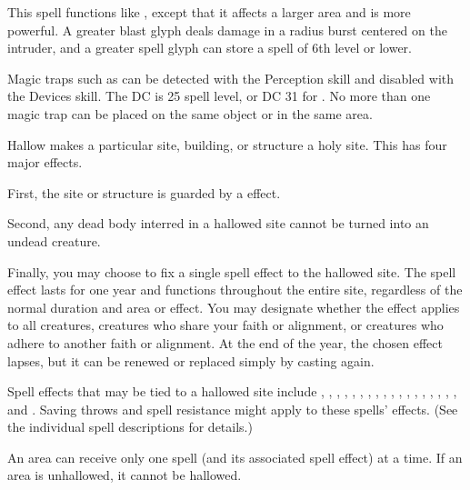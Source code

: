 \spelleffect This spell functions like , except that it affects a larger area and is more powerful. A greater blast glyph deals damage in a \areamed radius burst centered on the intruder, and a greater spell glyph can store a spell of 6th level or lower.
\spellnotes \par Magic traps such as  can be detected with the Perception skill and disabled with the Devices skill. The DC is 25 \add spell level, or DC 31 for . No more than one magic trap can be placed on the same object or in the same area.

\spelleffect Hallow makes a particular site, building, or structure a holy site. This has four major effects.
\par First, the site or structure is guarded by a  effect.
\par Second, any dead body interred in a hallowed site cannot be turned into an undead creature.
\par Finally, you may choose to fix a single spell effect to the hallowed site. The spell effect lasts for one year and functions throughout the entire site, regardless of the normal duration and area or effect. You may designate whether the effect applies to all creatures, creatures who share your faith or alignment, or creatures who adhere to another faith or alignment. At the end of the year, the chosen effect lapses, but it can be renewed or replaced simply by casting  again.
\par Spell effects that may be tied to a hallowed site include , , , , , , , , , , , , , , , , , , and . Saving throws and spell resistance might apply to these spells' effects. (See the individual spell descriptions for details.)
\spellnotes \par An area can receive only one  spell (and its associated spell effect) at a time. If an area is unhallowed, it cannot be hallowed.

